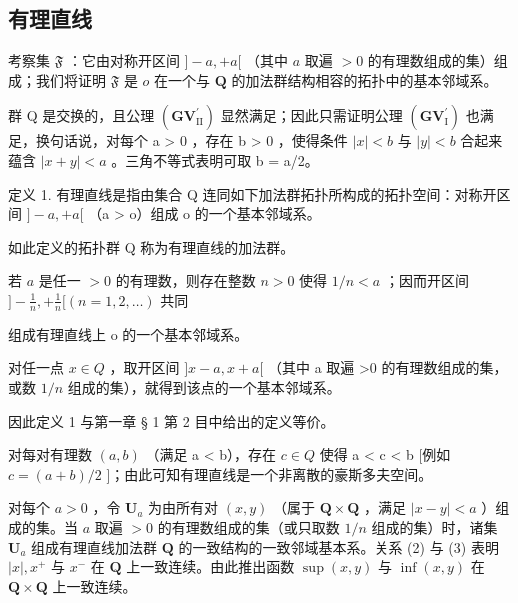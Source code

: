 \subsection{有理直线}

考察集 \(\mathfrak{F}\) ：它由对称开区间 \(]-a, +a[\) （其中 \(a\) 取遍 \(>0\) 的有理数组成的集）组成；我们将证明 \(\mathfrak{F}\) 是 \(o\) 在一个与 \(\mathbf{Q}\) 的加法群结构相容的拓扑中的基本邻域系。

群 Q 是交换的，且公理 \((\mathbf{GV}_{\mathrm{II}}^{\prime})\) 显然满足；因此只需证明公理 \((\mathbf{GV}_{\mathrm{I}}^{\prime})\) 也满足，换句话说，对每个 a \textgreater{} 0 ，存在 b \textgreater{} 0 ，使得条件 \(|x| < b\) 与 \(|y| < b\) 合起来蕴含 \(|x + y| < a\) 。三角不等式表明可取 b = a/2。

定义 1. 有理直线是指由集合 Q 连同如下加法群拓扑所构成的拓扑空间：对称开区间 \(]-a, +a[\) （a \textgreater{} o）组成 o 的一个基本邻域系。

如此定义的拓扑群 Q 称为有理直线的加法群。

若 \(a\) 是任一 \(> 0\) 的有理数，则存在整数 \(n > 0\) 使得 \(1 / n < a\) ；因而开区间 \(] - \frac{1}{n}, + \frac{1}{n} [ (n = 1, 2, \ldots) \text{ 共同}\)

组成有理直线上 o 的一个基本邻域系。

对任一点 \(x \in Q\) ，取开区间 \(]x - a, x + a[\) （其中 a 取遍 \textgreater0 的有理数组成的集，或数 \(1/n\) 组成的集），就得到该点的一个基本邻域系。

因此定义 1 与第一章 § 1 第 2 目中给出的定义等价。

对每对有理数 \((a, b)\) （满足 a \textless{} b），存在 \(c \in Q\) 使得 a \textless{} c \textless{} b {[}例如 \(c = (a + b)/2\) {]}；由此可知有理直线是一个非离散的豪斯多夫空间。

对每个 \(a > 0\) ，令 \(\mathbf{U}_a\) 为由所有对 \((x, y)\) （属于 \(\mathbf{Q} \times \mathbf{Q}\) ，满足 \(|x - y| < a\) ）组成的集。当 \(a\) 取遍 \(> 0\) 的有理数组成的集（或只取数 \(1/n\) 组成的集）时，诸集 \(\mathbf{U}_a\) 组成有理直线加法群 \(\mathbf{Q}\) 的一致结构的一致邻域基本系。关系 (2) 与 (3) 表明 \(|x|, x^+\) 与 \(x^-\) 在 \(\mathbf{Q}\) 上一致连续。由此推出函数 \(\sup (x, y)\) 与 \(\inf (x, y)\) 在 \(\mathbf{Q} \times \mathbf{Q}\) 上一致连续。

